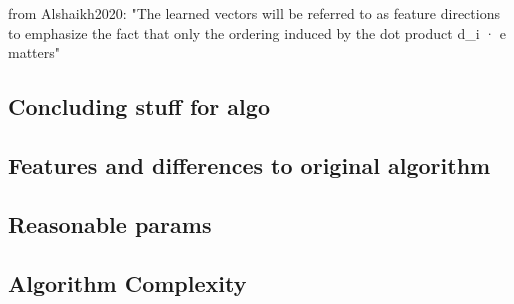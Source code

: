 from Alshaikh2020: "The learned vectors will be referred to as feature directions to emphasize the fact that only the ordering induced by the dot product d_i · e matters"


\subsection{Concluding stuff for algo}


\subsection{Features and differences to original algorithm}


\subsection{Reasonable params}


\subsection{Algorithm Complexity}